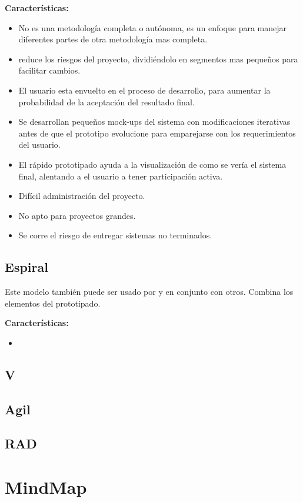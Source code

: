 \documentclass[spanish,12pt,letterpapper]{article}
\begin{document}
	\textbf{Características:}
	\begin{itemize}
	\item No es una metodología completa o autónoma, es un enfoque para manejar diferentes partes de otra metodología mas completa.
	\item reduce los riesgos del proyecto, dividiéndolo en segmentos mas pequeños para facilitar cambios.
	\item El usuario esta envuelto en el proceso de desarrollo, para aumentar la probabilidad de la aceptación del resultado final.
	\item Se desarrollan pequeños mock-ups del sistema con modificaciones iterativas antes de que el prototipo evolucione para emparejarse con los requerimientos del usuario.
	\item El rápido prototipado ayuda a la visualización de como se vería el sistema final, alentando a el usuario a tener participación activa.
	\item Difícil administración del proyecto. 
	\item No apto para proyectos grandes.
	\item Se corre el riesgo de entregar sistemas no terminados.
	\end{itemize}
	
	\subsection{Espiral}
	Este modelo también puede ser usado por y en conjunto con otros. Combina los elementos del prototipado.
	
	\textbf{Características:}
	\begin{itemize}
	\item 
	\end{itemize}
	
	\subsection{V}
	\subsection{Agil}
	\subsection{RAD}
	
	\section{MindMap}
	
\end{document}
